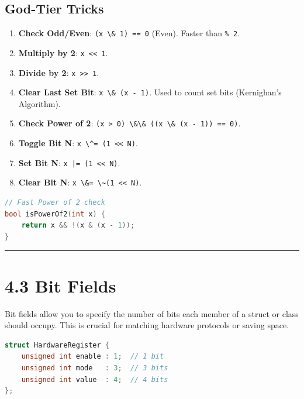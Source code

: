 \hypertarget{god-tier-tricks}{%
\subsection{God-Tier Tricks}\label{god-tier-tricks}}

\begin{enumerate}
\def\labelenumi{\arabic{enumi}.}
\tightlist
\item
  \textbf{Check Odd/Even}: \passthrough{\lstinline!(x \& 1) == 0!}
  (Even). Faster than \passthrough{\lstinline!\% 2!}.
\item
  \textbf{Multiply by 2}: \passthrough{\lstinline!x << 1!}.
\item
  \textbf{Divide by 2}: \passthrough{\lstinline!x >> 1!}.
\item
  \textbf{Clear Last Set Bit}: \passthrough{\lstinline!x \& (x - 1)!}.
  Used to count set bits (Kernighan's Algorithm).
\item
  \textbf{Check Power of 2}:
  \passthrough{\lstinline!(x > 0) \&\& ((x \& (x - 1)) == 0)!}.
\item
  \textbf{Toggle Bit N}: \passthrough{\lstinline!x \^= (1 << N)!}.
\item
  \textbf{Set Bit N}: \passthrough{\lstinline!x |= (1 << N)!}.
\item
  \textbf{Clear Bit N}: \passthrough{\lstinline!x \&= \~(1 << N)!}.
\end{enumerate}

\begin{lstlisting}[language={C++}]
// Fast Power of 2 check
bool isPowerOf2(int x) {
    return x && !(x & (x - 1));
}
\end{lstlisting}

\begin{center}\rule{0.5\linewidth}{0.5pt}\end{center}

\hypertarget{bit-fields}{%
\section{4.3 Bit Fields}\label{bit-fields}}

Bit fields allow you to specify the number of bits each member of a
struct or class should occupy. This is crucial for matching hardware
protocols or saving space.

\begin{lstlisting}[language={C++}]
struct HardwareRegister {
    unsigned int enable : 1;  // 1 bit
    unsigned int mode   : 3;  // 3 bits
    unsigned int value  : 4;  // 4 bits
};
\end{lstlisting}

